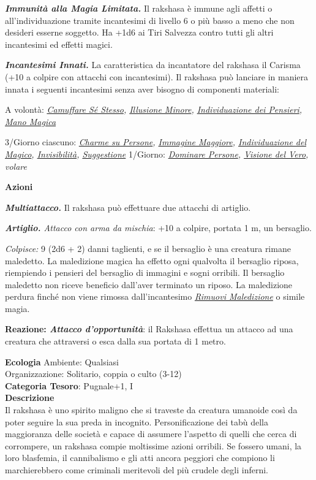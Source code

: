\begin{multicols}{2}
{\emph{\textbf{Immunità alla Magia Limitata.}} Il rakshasa è immune agli affetti o all'individuazione tramite incantesimi di livello 6 o più basso a meno che non desideri esserne soggetto. Ha +1d6 ai Tiri Salvezza contro tutti gli altri incantesimi ed effetti magici.

\emph{\textbf{Incantesimi Innati.}} La caratteristica da incantatore del rakshasa il Carisma (+10 a colpire con attacchi con incantesimi). Il rakshasa può lanciare in maniera innata i seguenti incantesimi senza aver bisogno di componenti materiali:

A volontà: \emph{\hyperlink{Camuffare Sé Stesso}{Camuffare Sé Stesso}, \hyperlink{Illusione Minore}{Illusione Minore}, \hyperlink{Individuazione dei Pensieri}{Individuazione dei Pensieri}, \hyperlink{Mano Magica}{Mano Magica}}

3/Giorno ciascuno: \emph{\hyperlink{Charme su Persone}{Charme su Persone}, \hyperlink{Immagine Maggiore}{Immagine Maggiore}, \hyperlink{Individuazione del Magico}{Individuazione del Magico}, \hyperlink{Invisibilità}{Invisibilità}, \hyperlink{Suggestione}{Suggestione}} 1/Giorno: \emph{\hyperlink{Dominare Persone}{Dominare Persone}, \hyperlink{Visione del Vero}{Visione del Vero}, volare}

\textbf{Azioni}

\emph{\textbf{Multiattacco.}} Il rakshasa può effettuare due attacchi di artiglio.

\emph{\textbf{Artiglio.} Attacco con arma da mischia}: +10 a colpire, portata 1 m, un bersaglio.

\emph{Colpisce:} 9 (2d6 + 2) danni taglienti, e se il bersaglio è una creatura rimane maledetto. La maledizione magica ha effetto ogni qualvolta il bersaglio riposa, riempiendo i pensieri del bersaglio di immagini e sogni orribili. Il bersaglio maledetto non riceve beneficio dall'aver terminato un riposo. La maledizione perdura finché non viene rimossa dall'incantesimo \emph{\hyperlink{Rimuovi Maledizione}{Rimuovi Maledizione}} o simile magia.

\textbf{Reazione: \emph{Attacco d'opportunità}}: il Rakshasa effettua un attacco ad una creatura che attraversi o esca dalla sua portata di 1 metro.

\textbf{Ecologia}
Ambiente: Qualsiasi\\
Organizzazione: Solitario, coppia o culto (3-12)\\
\textbf{Categoria Tesoro}: Pugnale+1, I\\
\textbf{Descrizione}\\
Il rakshasa è uno spirito maligno che si traveste da creatura umanoide così da poter seguire la sua preda in incognito. Personificazione dei tabù della maggioranza delle società e capace di assumere l'aspetto di quelli che cerca di corrompere, un rakshasa compie moltissime azioni orribili. Se fossero umani, la loro blasfemia, il cannibalismo e gli atti ancora peggiori che compiono li marchierebbero come criminali meritevoli del più crudele degli inferni.

}
\end{multicols}

